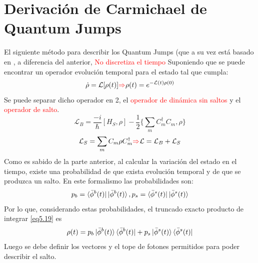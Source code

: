 \documentclass{book}
\begin{document}
\section{Derivación de Carmichael de Quantum Jumps}
El siguiente método para describir los Quantum Jumps (que a su vez está basado en \cite{Carmichael}, a diferencia del anterior, \textcolor{red}{No discretiza el tiempo}
Suponiendo que se puede encontrar un operador evolución temporal para el estado tal que cumpla:
\begin{equation}\label{eq5.19}\dot{\rho}=\mathcal{L}[\rho(t)]\textcolor{red}{\Rightarrow}\rho(t)=e^{-\mathcal{L}(t)\rho(0)}\end{equation}
Se puede separar dicho operador en 2, el \textcolor{red}{operador de dinámica sin saltos} y el \textcolor{red}{operador de salto}.
\begin{equation}\label{eq5.20}\mathcal{L}_B=\frac{-i}{\hslash}[H_S,\rho]-\frac{1}{2}\{\sum_m C_m^\dag C_m,\rho\}\end{equation}
\begin{equation}\label{eq5.21}\mathcal{L}_S=\sum_m C_m\rho C_m^\dag \textcolor{red}{\Rightarrow} \mathcal{L}=\mathcal{L}_B+\mathcal{L}_S\end{equation}
Como es sabido de la parte anterior, al calcular la variación del estado en el tiempo, existe una probabilidad de que exista evolución temporal y de que se produzca un salto. En este formalismo las probabilidades son:
\begin{equation}\label{eq5.22}p_b=\bra{\bar{\phi}^b(t)}\ket{\bar{\phi}^b(t)}, p_s=\bra{\bar{\phi}^s(t)}\ket{\bar{\phi}^s(t)}\end{equation}
Por lo que, considerando estas probabilidades, el truncado exacto producto de integrar \ref{eq5.19} es
\begin{equation}\label{eq5.23}\rho(t)=p_b\ket{\bar{\phi}^b(t)}\bra{\bar{\phi}^b(t)}+p_s\ket{\bar{\phi}^s(t)}\bra{\bar{\phi}^s(t)}\end{equation}
Luego se debe definir los vectores  y el tope de fotones permitidos para poder describir el salto. 
\end{document}
